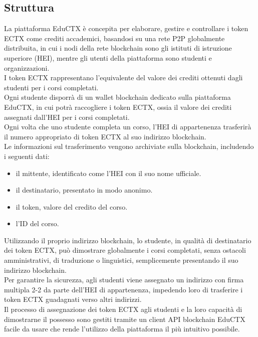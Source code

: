 \subsection{Struttura}
La piattaforma EduCTX è concepita per elaborare, gestire e controllare i token ECTX come crediti accademici, basandosi su una rete P2P globalmente distribuita, 
in cui i nodi della rete blockchain sono gli istituti di istruzione superiore (HEI), mentre gli utenti della piattaforma sono studenti e organizzazioni.
\\I token ECTX rappresentano l’equivalente del valore dei crediti ottenuti dagli studenti per i corsi completati.
\\Ogni studente disporrà di un wallet blockchain dedicato sulla piattaforma EduCTX, in cui potrà raccogliere i token ECTX, ossia il valore dei crediti assegnati dall’HEI per i corsi completati. 
\\Ogni volta che uno studente completa un corso, l’HEI di appartenenza trasferirà il numero appropriato di token ECTX al suo indirizzo blockchain. 
\\Le informazioni sul trasferimento vengono archiviate sulla blockchain, 
includendo i seguenti dati: 
\begin{itemize}
    \item il mittente, identificato come l’HEI con il suo nome ufficiale.
    \item il destinatario, presentato in modo anonimo.
    \item il token, valore del credito del corso.
    \item l’ID del corso.
\end{itemize}
Utilizzando il proprio indirizzo blockchain, lo studente, in qualità di destinatario dei token ECTX, può dimostrare globalmente i corsi completati, senza ostacoli amministrativi, di traduzione o linguistici, semplicemente presentando il suo indirizzo blockchain. 
\\Per garantire la sicurezza, agli studenti viene assegnato un indirizzo con firma multipla 2-2 da parte dell’HEI di appartenenza, impedendo loro di trasferire i token ECTX guadagnati verso altri indirizzi. 
\\Il processo di assegnazione dei token ECTX agli studenti e la loro capacità di dimostrarne il possesso sono gestiti tramite un client API blockchain EduCTX facile da usare che rende l’utilizzo della piattaforma il più intuitivo possibile.
